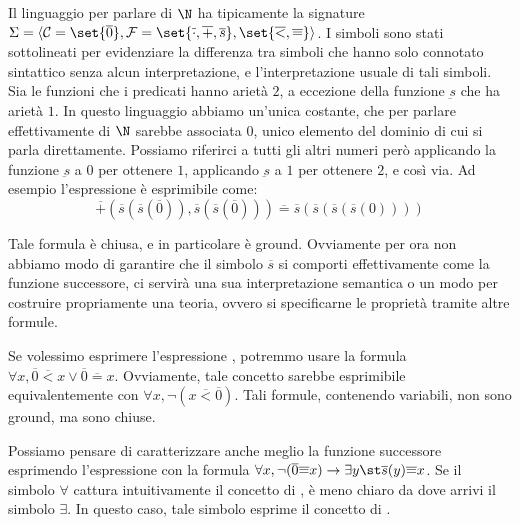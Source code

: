 Il linguaggio per parlare di \(\N\) ha tipicamente la signature \(\Sigma = \langle \ConstSyms = \set{\overline{0}}, \FuncSyms=\set{\overline{\cdot}, \overline{+}, \overline{s}},\set{\overline{<}, \overline{=}} \rangle\). I simboli sono stati sottolineati per evidenziare la differenza tra simboli che hanno solo connotato sintattico senza alcun interpretazione, e l'interpretazione usuale di tali simboli. Sia le funzioni che i predicati hanno arietà \(2\), a eccezione della funzione \(\underbar{s}\) che ha arietà \(1\). In questo linguaggio abbiamo un'unica costante, che per parlare effettivamente di \(\N\) sarebbe associata \(0\), unico elemento del dominio di cui si parla direttamente. Possiamo riferirci a tutti gli altri numeri però applicando la funzione \(\underbar{s}\) a \(0\) per ottenere \(1\), applicando \(\underbar{s}\) a \(1\) per ottenere \(2\), e così via. Ad esempio l'espressione  è esprimibile come:
\[\overline{+}(\overline{s}(\overline{s}(\overline{0})), \overline{s}(\overline{s}(\overline{0})))\overline{=} \overline{s}(\overline{s}(\overline{s}(\overline{s}(0))))\]

Tale formula è chiusa, e in particolare è ground.
Ovviamente per ora non abbiamo modo di garantire che il simbolo \(\overline{s}\) si comporti effettivamente come la funzione successore, ci servirà una sua interpretazione semantica o un modo per costruire propriamente una teoria, ovvero si specificarne le proprietà tramite altre formule.

Se volessimo esprimere l'espressione , potremmo usare la formula \(\forall x, \overline{0} \overline{<} x \lor \overline{0}\overline{=}x\). Ovviamente, tale concetto sarebbe esprimibile equivalentemente con \(\forall x, \neg(x\overline{<}\overline{0})\). Tali formule, contenendo variabili, non sono ground, ma sono chiuse.

Possiamo pensare di caratterizzare anche meglio la funzione successore esprimendo l'espressione  con la formula \(\forall x, \neg(\overline{0}\overline{=}x)\to\exists y\st \overline{s}(y)\overline{=}x\). Se il simbolo \(\forall\) cattura intuitivamente il concetto di , è meno chiaro da dove arrivi il simbolo \(\exists\). In questo caso, tale simbolo esprime il concetto di . 

